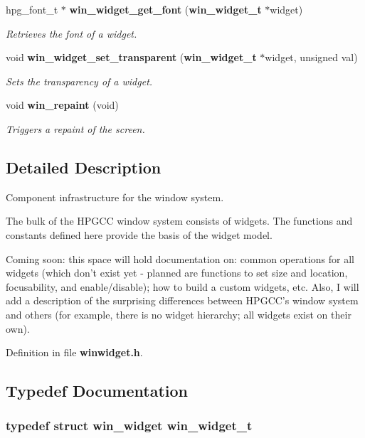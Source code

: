\begin{CompactItemize}
hpg\_\-font\_\-t $\ast$ {\bf win\_\-widget\_\-get\_\-font} ({\bf win\_\-widget\_\-t} $\ast$widget)
\begin{CompactList}\small\item\em Retrieves the font of a widget. \item\end{CompactList}\item 
void {\bf win\_\-widget\_\-set\_\-transparent} ({\bf win\_\-widget\_\-t} $\ast$widget, unsigned val)
\begin{CompactList}\small\item\em Sets the transparency of a widget. \item\end{CompactList}\item 
void {\bf win\_\-repaint} (void)
\begin{CompactList}\small\item\em Triggers a repaint of the screen. \item\end{CompactList}\end{CompactItemize}


\subsection{Detailed Description}
Component infrastructure for the window system. 

The bulk of the HPGCC window system consists of widgets. The functions and constants defined here provide the basis of the widget model.

Coming soon: this space will hold documentation on: common operations for all widgets (which don't exist yet - planned are functions to set size and location, focusability, and enable/disable); how to build a custom widgets, etc. Also, I will add a description of the surprising differences between HPGCC's window system and others (for example, there is no widget hierarchy; all widgets exist on their own). 

Definition in file {\bf winwidget.h}.

\subsection{Typedef Documentation}
\subsubsection{\setlength{\rightskip}{0pt plus 5cm}typedef struct win\_\-widget {\bf win\_\-widget\_\-t}}\label{winwidget_8h_a1}


